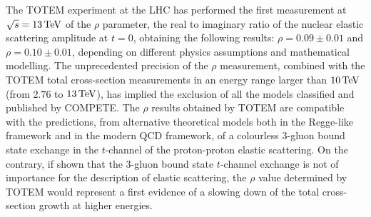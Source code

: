 The TOTEM experiment at the LHC has performed the first measurement at $\sqrt s = 13\,{\rm TeV}$ of the $\rho$ parameter, the real to imaginary ratio of the nuclear elastic scattering amplitude at $t=0$, obtaining the following results: $\rho = 0.09 \pm 0.01$ and $\rho = 0.10 \pm 0.01$, depending on different physics assumptions and mathematical modelling. The unprecedented precision of the $\rho$ measurement, combined with the TOTEM total cross-section measurements in an energy range larger than $10\,{\rm TeV}$ (from $2.76$ to $13\,{\rm TeV}$), has implied the exclusion of all the models classified and published by COMPETE. The $\rho$ results obtained by TOTEM are compatible with the predictions, from alternative theoretical models both in the Regge-like framework and in the modern QCD framework, of a colourless 3-gluon bound state exchange in the $t$-channel of the proton-proton elastic scattering. On the contrary, if shown that the 3-gluon bound state $t$-channel exchange is not of importance for the description of elastic scattering, the $\rho$ value determined by TOTEM would represent a first evidence of a slowing down of the total cross-section growth at higher energies.
